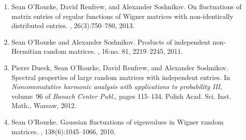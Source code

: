 \documentclass[letterpaper]{article}
\begin{document}
\begin{enumerate}
	\item Sean O'Rourke, David Renfrew, and Alexander Soshnikov.
	\newblock On fluctuations of matrix entries of regular functions of {W}igner matrices with non-identically distributed entries.
	, 26(3):750--780, 2013.
	\item Sean O'Rourke and Alexander Soshnikov.
	\newblock Products of independent non-{H}ermitian random matrices.
	, 16:no. 81, 2219--2245, 2011.
	\item Pierre Dueck, Sean O'Rourke, David Renfrew, and Alexander Soshnikov.
	\newblock Spectral properties of large random matrices with independent entries.
	\newblock In {\em Noncommutative harmonic analysis with applications to probability {III}}, volume~96 of {\em Banach Center Publ.}, pages 115--134. Polish Acad. Sci. Inst. Math., Warsaw, 2012.
	\item Sean O'Rourke.
	\newblock Gaussian fluctuations of eigenvalues in {W}igner random matrices.
	, 138(6):1045--1066, 2010.
\end{enumerate}
\end{document}
